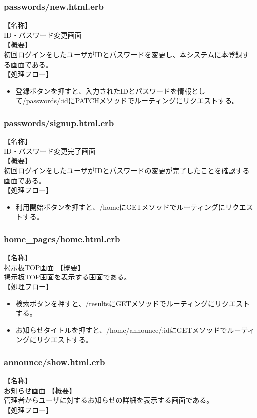 \documentclass[a4j]{jarticle}
\begin{document}
\subsubsection{passwords/new.html.erb}
\noindent
【名称】\\
ID・パスワード変更画面\\
【概要】\\
初回ログインをしたユーザがIDとパスワードを変更し、本システムに本登録する画面である。\\
【処理フロー】
\begin{itemize}
  \item 登録ボタンを押すと、入力されたIDとパスワードを情報として/passwords/:idにPATCHメソッドでルーティングにリクエストする。
\end{itemize}

\subsubsection{passwords/signup.html.erb}
\noindent
【名称】\\
ID・パスワード変更完了画面\\
【概要】\\
初回ログインをしたユーザがIDとパスワードの変更が完了したことを確認する画面である。\\
【処理フロー】
\begin{itemize}
  \item 利用開始ボタンを押すと、/homeにGETメソッドでルーティングにリクエストする。
\end{itemize}


\subsubsection{home\_pages/home.html.erb}
\noindent
【名称】\\
掲示板TOP画面
【概要】\\
掲示板TOP画面を表示する画面である。\\
【処理フロー】
\begin{itemize}
  \item 検索ボタンを押すと、/resultsにGETメソッドでルーティングにリクエストする。
  \item お知らせタイトルを押すと、/home/announce/:idにGETメソッドでルーティングにリクエストする。
\end{itemize}

\subsubsection{announce/show.html.erb}
\noindent
【名称】\\
お知らせ画面
【概要】\\
管理者からユーザに対するお知らせの詳細を表示する画面である。\\
【処理フロー】
-
\end{document}
